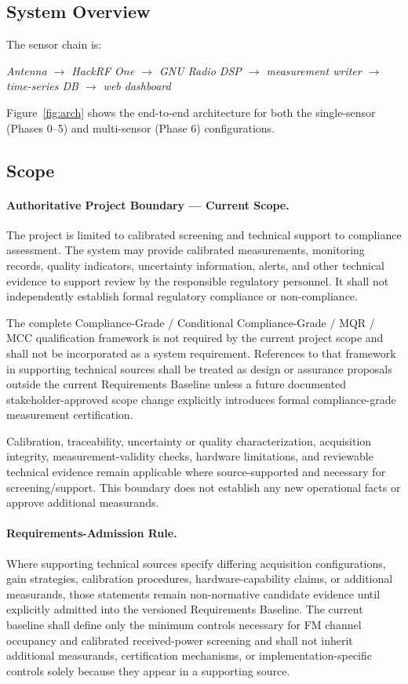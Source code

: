 \documentclass[12pt,a4paper]{report}
\begin{document}
 \subsection*{System Overview}
 The sensor chain is:
 \begin{center}
 	\textit{Antenna $\rightarrow$ HackRF One $\rightarrow$ GNU Radio DSP
 		$\rightarrow$ measurement writer $\rightarrow$ time-series DB
 		$\rightarrow$ web dashboard}
 \end{center}
 Figure~\ref{fig:arch} shows the end-to-end architecture for both the
 single-sensor (Phases 0--5) and multi-sensor (Phase 6) configurations.
 
 \subsection*{Scope}

\paragraph*{Authoritative Project Boundary --- Current Scope.}
The project is limited to calibrated screening and technical support to compliance assessment. The system may provide calibrated measurements, monitoring records, quality indicators, uncertainty information, alerts, and other technical evidence to support review by the responsible regulatory personnel. It shall not independently establish formal regulatory compliance or non-compliance.

The complete Compliance-Grade / Conditional Compliance-Grade / MQR / MCC qualification framework is not required by the current project scope and shall not be incorporated as a system requirement. References to that framework in supporting technical sources shall be treated as design or assurance proposals outside the current Requirements Baseline unless a future documented stakeholder-approved scope change explicitly introduces formal compliance-grade measurement certification.

Calibration, traceability, uncertainty or quality characterization, acquisition integrity, measurement-validity checks, hardware limitations, and reviewable technical evidence remain applicable where source-supported and necessary for screening/support. This boundary does not establish any new operational facts or approve additional measurands.

\paragraph*{Requirements-Admission Rule.}
Where supporting technical sources specify differing acquisition configurations, gain strategies, calibration procedures, hardware-capability claims, or additional measurands, those statements remain non-normative candidate evidence until explicitly admitted into the versioned Requirements Baseline. The current baseline shall define only the minimum controls necessary for FM channel occupancy and calibrated received-power screening and shall not inherit additional measurands, certification mechanisms, or implementation-specific controls solely because they appear in a supporting source.
\end{document}

